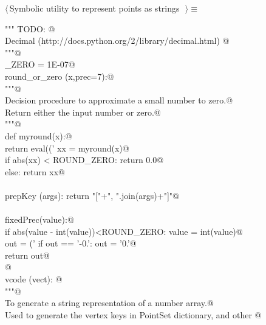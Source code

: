 \documentclass[11pt,oneside]{article}	%
\begin{document}
\begin{flushleft} \small \label{scrap52}
$\langle\,$Symbolic utility to represent points as strings\nobreak\ {\footnotesize {}}$\,\rangle\equiv$
\vspace{-1ex}
\begin{list}{}{} \item
\mbox{}\verb@""" TODO: @\\
\mbox{}\verb@use Decimal (http://docs.python.org/2/library/decimal.html) @\\
\mbox{}\verb@"""@\\
\mbox{}\verb@ROUND_ZERO = 1E-07@\\
\mbox{}\verb@def round_or_zero (x,prec=7):@\\
\mbox{}\verb@   """@\\
\mbox{}\verb@   Decision procedure to approximate a small number to zero.@\\
\mbox{}\verb@   Return either the input number or zero.@\\
\mbox{}\verb@   """@\\
\mbox{}\verb@   def myround(x):@\\
\mbox{}\verb@      return eval(('%.'+str(prec)+'f') % round(x,prec))@\\
\mbox{}\verb@   xx = myround(x)@\\
\mbox{}\verb@   if abs(xx) < ROUND_ZERO: return 0.0@\\
\mbox{}\verb@   else: return xx@\\
\mbox{}\verb@@\\
\mbox{}\verb@def prepKey (args): return "["+", ".join(args)+"]"@\\
\mbox{}\verb@@\\
\mbox{}\verb@def fixedPrec(value):@\\
\mbox{}\verb@   if abs(value - int(value))<ROUND_ZERO: value = int(value)@\\
\mbox{}\verb@   out = ('%0.7f'% value).rstrip('0')@\\
\mbox{}\verb@   if out == '-0.': out = '0.'@\\
\mbox{}\verb@   return out@\\
\mbox{}\verb@   @\\
\mbox{}\verb@def vcode (vect): @\\
\mbox{}\verb@   """@\\
\mbox{}\verb@   To generate a string representation of a number array.@\\
\mbox{}\verb@   Used to generate the vertex keys in PointSet dictionary, and other @\\

\end{list}
\end{flushleft}
\end{document}

